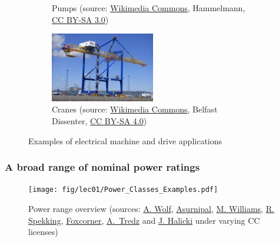\begin{frame}
\begin{figure}
\begin{subfigure}[b]{0.49\textwidth}
			\caption{Pumps (source: \href{https://commons.wikimedia.org/wiki/File:Hammelmann_Stationary_unit_with_electric_motor.jpg}{Wikimedia Commons}, Hammelmann, \href{https://creativecommons.org/licenses/by-sa/3.0/deed.en}{CC BY-SA 3.0})}
		\end{subfigure}
		\hfill
		\begin{subfigure}[b]{0.49\textwidth}
			\centering
			\includegraphics[width=0.5\textwidth]{fig/lec01/crane.jpg}
			\caption{Cranes (source: \href{https://commons.wikimedia.org/wiki/File:Hammelmann_Stationary_unit_with_electric_motor.jpg}{Wikimedia Commons}, Belfast Dissenter, \href{https://creativecommons.org/licenses/by-sa/4.0/deed.en}{CC BY-SA 4.0})}
		\end{subfigure}
		\caption*{Examples of electrical machine and drive applications} 
        \label{fig:examples_machine_drives_02}
	\end{figure}
\end{frame}

\begin{frame}
	\frametitle{A broad range of nominal power ratings}
	\begin{figure}
		\centering
		\texttt{[image: fig/lec01/Power\_Classes\_Examples.pdf]}
		\caption{Power range overview (sources: \href{https://www.flickr.com/photos/arthurwolf/5393520058/}{A. Wolf}, \href{https://commons.wikimedia.org/wiki/File:Wald_am_Arlberg-OeBB_Spullersee_power_plant-M1-Rotor-11ASD.jpg}{Asurnipal}, \href{https://www.flickr.com/photos/mouser-nerdbot/7042785635}{M. Williams}, \href{https://de.m.wikipedia.org/wiki/Datei:Stick_blender_Electrolux_AEG_HB_9807_-_stator_of_the_electric_motor-4313.jpg}{R. Spekking}, \href{https://commons.wikimedia.org/wiki/File:Electric_motor_and_transmission_in_a_truck.jpg}{Foxcorner}, \href{https://commons.wikimedia.org/wiki/File:E-bike_electric_motor_shimano_ep_8.jpg}{A.~Tredz} and \href{https://commons.wikimedia.org/wiki/File:2023_Corsair_SP120_RGB_Elite.jpg}{J. Halicki} under varying CC licenses) }
		\label{Power_Classes_Examples}
	\end{figure}
\end{frame}

